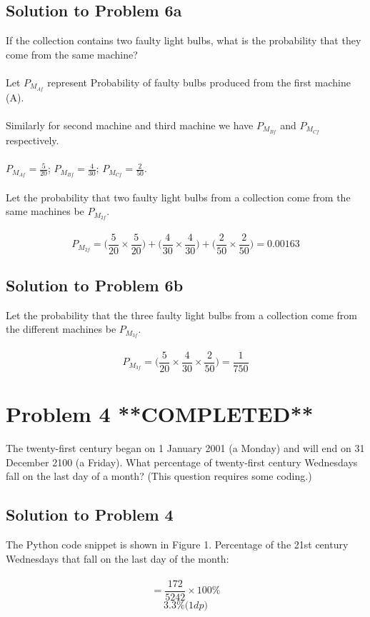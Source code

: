 \documentclass{article}
\begin{document}
\subsection{Solution to Problem 6a}
If the collection contains two faulty light bulbs, what is the probability that they come from the same machine? \\\\
Let $P_{M_{Af}}$ represent Probability of faulty bulbs produced from the first machine (A). \\ \\
Similarly for second machine and third machine we have $P_{M_{Bf}}$ and $P_{M_{Cf}}$ respectively. \\ \\
$P_{M_{Af}} = \frac{5}{20}$; \enspace $P_{M_{Bf}} = \frac{4}{30}$; \enspace $P_{M_{Cf}} = \frac{2}{50}$. \\ \\

Let the probability that two faulty light bulbs from a collection come from the same machines be $P_{M_{2f}}$. \\\\
$$P_{M_{2f}} = \Big( \frac{5}{20} \times \frac{5}{20}\Big) + \Big( \frac{4}{30} \times \frac{4}{30}\Big) + \Big( \frac{2}{50} \times \frac{2}{50}\Big) = 0.00163$$

\subsection{Solution to Problem 6b}
Let the probability that the three faulty light bulbs from a collection come from the different machines be $P_{M_{3f}}$. \\\\
$$P_{M_{3f}} = \Big( \frac{5}{20} \times \frac{4}{30} \times \frac{2}{50} \Big) = \frac{1}{750}$$

\section{Problem 4 **COMPLETED**}
The twenty-first century began on 1 January 2001 (a Monday) and will end on 31 December 2100 (a Friday). What percentage of twenty-first century Wednesdays fall on the last day of a month? (This question requires some coding.)

\subsection{Solution to Problem 4}
The Python code snippet is shown in Figure 1. Percentage of the 21st century Wednesdays that fall on the last day of the month: \\\\
$$ = \frac{172}{5242} \times 100 \% $$
$$ 3.3\%  \textit{(1dp)}$$
\end{document}
